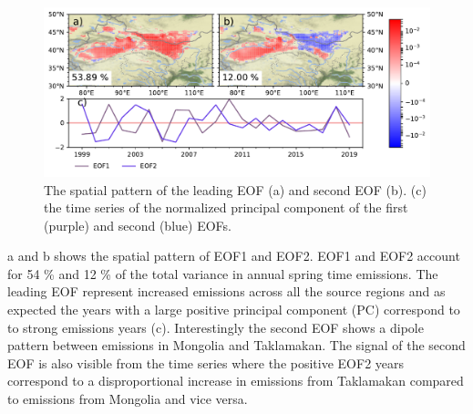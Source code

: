 \begin{figure}[htbp]
    \centering
    \includegraphics[width=\textwidth]{texfiles/figs/Emissions_EOF.pdf}
    \caption{The spatial pattern of the leading EOF (a) and second EOF (b). (c) the time series of the normalized principal component of the first (purple) and second (blue) EOFs.}
    \label{fig:emissions_eof}
\end{figure}
a and b shows the spatial pattern of EOF1 and EOF2. EOF1 and EOF2 account for 54 \% and 12 \% of the total variance in annual spring time emissions. The leading EOF represent increased emissions across all the source regions and as expected the years with a large positive principal component (PC) correspond to to strong emissions years (c). Interestingly the second EOF shows a dipole pattern between emissions in Mongolia and Taklamakan. The signal of the second EOF is also visible from the time series where the positive EOF2 years correspond to a disproportional increase in emissions from Taklamakan compared to emissions from Mongolia and vice versa.       

